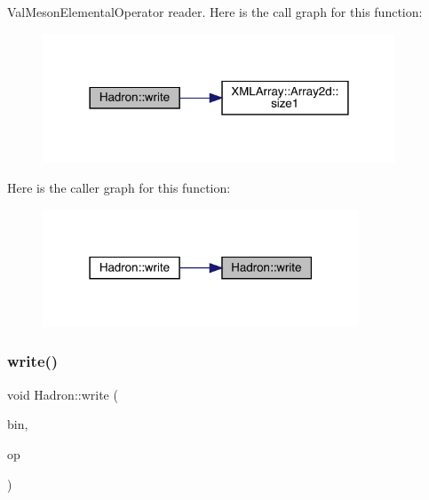 Val\+Meson\+Elemental\+Operator reader. Here is the call graph for this function\+:\nopagebreak
\begin{figure}[H]
\begin{center}
\leavevmode
\includegraphics[width=298pt]{d1/daf/namespaceHadron_af16b79349f97386286cfc1cd9dfb73f0_cgraph}
\end{center}
\end{figure}
Here is the caller graph for this function\+:\nopagebreak
\begin{figure}[H]
\begin{center}
\leavevmode
\includegraphics[width=267pt]{d1/daf/namespaceHadron_af16b79349f97386286cfc1cd9dfb73f0_icgraph}
\end{center}
\end{figure}
\mbox{\label{namespaceHadron_a8953a24e53ffe4d60e9c0ba26a48a9e3}} 
\subsubsection{\texorpdfstring{write()}{write()}\hspace{0.1cm}{\footnotesize\ttfamily [64/95]}}
{\footnotesize\ttfamily void Hadron\+::write (\begin{DoxyParamCaption}\item[{\mbox{\hyperlink{classADATIO_1_1BinaryWriter}{Binary\+Writer}} \&}]{bin,  }\item[{const \mbox{\hyperlink{structHadron_1_1HadronQuarkLocation__t}{Hadron\+Quark\+Location\+\_\+t}} \&}]{op }\end{DoxyParamCaption})}



